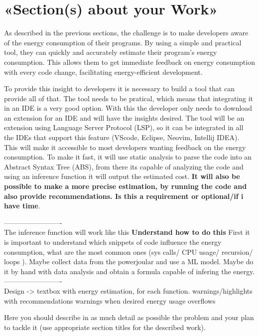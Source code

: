 \documentclass[sigplan]{acmart}
\begin{document}
\section{«Section(s) about your Work»} \label{sec:work1}

As described in the previous sections, the challenge is to make developers aware of the energy consumption of their programs. By using a simple and practical tool, they can quickly and accurately estimate their program's energy consumption. This allows them to get immediate feedback on energy consumption with every code change, facilitating energy-efficient development.

To provide this insight to developers it is necessary to build a tool that can provide all of that. The tool needs to be pratical, which means that integrating it in an IDE is a very good option. With this the developer only needs to download an extension for an IDE and will have the insights desired.
The tool will be an extension using Language Server Protocol (LSP), so it can be integrated in all the IDEs that support this feature (VScode, Eclipse, Neovim, Intellij IDEA). This will make it accessible to most developers wanting feedback on the energy consumption. To make it fast, it will use static analysis to parse the code into an Abstract Syntax Tree (ABS), from there its capable of analyzing the code and using an inference function it will output the estimated cost. \textbf{It will also be possible to make a more precise estimation, by running the code and also provide recommendations. Is this a requirement or optional/if i have time}.

-------------------------\\
The inference function will work like this \textbf{Understand how to do this}
First it is important to understand which snippets of code influence the energy consumption, what are the most common ones (sys calls/ CPU usage/ recursion/ loops ).
Maybe collect data from the powerjoular and use a ML model.
Maybe do it by hand with data analysis and obtain a formula capable of infering the energy.
-------------------------\\


Design -> textbox with energy estimation, for each function. 
          warnings/highlights with recommendations
          warnings when desired energy usage overflows 


Here you should describe in as much detail as possible the problem and your plan to tackle it (use appropriate section titles for the described work). \\
\end{document}
